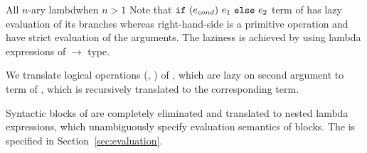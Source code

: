 All $n$-ary lambdwhen $n>1$
Note that $\IfThenElse{e_{cond}}{e_1}{e_2}$ term of \langname has lazy
evaluation of its branches whereas right-hand-side  is a primitive
operation and have strict evaluation of the arguments. The laziness
is achieved by using lambda expressions of  $\to$ 
type.

We translate logical operations (\lst{||}, \lst{&&}) of \langname, which are
lazy on second argument to  term of \langname, which is recursively
translated to the corresponding \corelang term.

Syntactic blocks of \langname are completely eliminated and translated to
nested lambda expressions, which unambiguously specify evaluation semantics
of blocks. The \corelang is specified in Section~\ref{sec:evaluation}.

